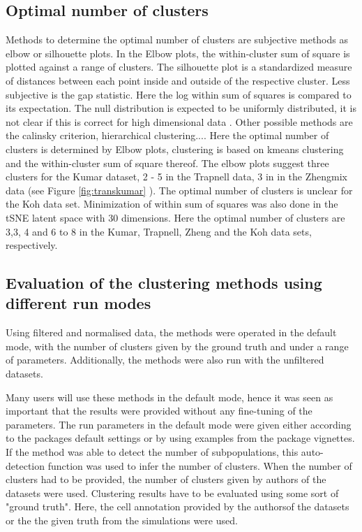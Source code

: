 \documentclass[12pt, a4paper]{article}\usepackage[]{graphicx}\usepackage[]{color}
\begin{document}
\subsection{Optimal number of clusters}
Methods to determine the optimal number of clusters are subjective methods as elbow or silhouette plots. In the Elbow plots, the within-cluster sum of square is plotted against a range of clusters. The silhouette plot is a standardized measure of distances between each point inside and outside of the respective cluster. Less subjective is the gap statistic. Here the log within sum of squares is compared to its expectation. The null distribution is expected to be uniformly distributed, it is not clear if this is correct for high dimensional data \citep{tibshirani2001estimating}. Other possible methods are the calinsky criterion, hierarchical clustering....
Here the optimal number of clusters is determined by Elbow plots, clustering is based on kmeans clustering and the within-cluster sum of square thereof.
The elbow plots suggest three clusters for the Kumar dataset, 2 - 5 in the Trapnell data, 3 in in the Zhengmix data (see Figure \ref{fig:transkumar} ). The optimal number of clusters is unclear for the Koh data set. 
Minimization of within sum of squares was also done in the tSNE latent space with 30 dimensions. Here the optimal number of clusters are 3,3, 4 and 6 to 8  in the Kumar, Trapnell, Zheng and the Koh data sets, respectively.

\newpage
\subsection{Evaluation of the clustering methods using different run modes}
Using filtered and normalised data, the methods were operated in the default mode, with the number of clusters given by the ground truth and under a range of parameters. Additionally, the methods were also run with the unfiltered datasets. 

Many users will use these methods in the default mode, hence it was seen as important that the results were provided without any fine-tuning of the parameters.
The run parameters in the default mode were given either according to the packages default settings or by using examples from the package vignettes. If the method was able to detect the number of subpopulations, this auto-detection function was used to infer the number of clusters. When the number of clusters had to be provided, the number of clusters given by  authors of the datasets were used. Clustering results have to be evaluated using some sort of "ground truth". Here, the cell annotation provided by the authorsof the datasets or the the given truth from the simulations were used.
\end{document}
